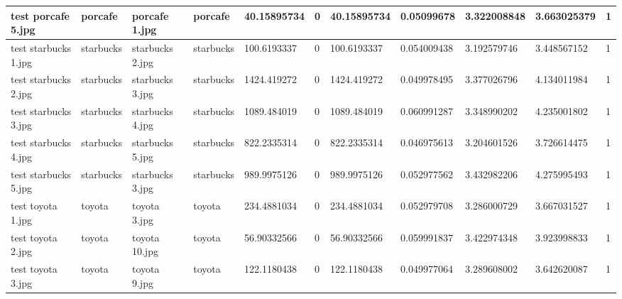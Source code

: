 \begin{landscape}
\begin{longtable}{|p{2cm}|p{1.5cm}|p{2cm}|p{1.5cm}|p{2cm}|p{1cm}|p{2cm}|p{2cm}|p{2cm}|p{2cm}|p{1cm}|}
		test porcafe 5.jpg   & porcafe          & porcafe 1.jpg         & porcafe                     & 40.15895734           & 0                       & 40.15895734                & 0.05099678            & 3.322008848           & 3.663025379              & 1                \\ \hline
		test starbucks 1.jpg & starbucks        & starbucks 2.jpg       & starbucks                   & 100.6193337           & 0                       & 100.6193337                & 0.054009438           & 3.192579746           & 3.448567152              & 1                \\ \hline
		test starbucks 2.jpg & starbucks        & starbucks 3.jpg       & starbucks                   & 1424.419272           & 0                       & 1424.419272                & 0.049978495           & 3.377026796           & 4.134011984              & 1                \\ \hline
		test starbucks 3.jpg & starbucks        & starbucks 4.jpg       & starbucks                   & 1089.484019           & 0                       & 1089.484019                & 0.060991287           & 3.348990202           & 4.235001802              & 1                \\ \hline
		test starbucks 4.jpg & starbucks        & starbucks 5.jpg       & starbucks                   & 822.2335314           & 0                       & 822.2335314                & 0.046975613           & 3.204601526           & 3.726614475              & 1                \\ \hline
		test starbucks 5.jpg & starbucks        & starbucks 3.jpg       & starbucks                   & 989.9975126           & 0                       & 989.9975126                & 0.052977562           & 3.432982206           & 4.275995493              & 1                \\ \hline
		test toyota 1.jpg    & toyota           & toyota 3.jpg          & toyota                      & 234.4881034           & 0                       & 234.4881034                & 0.052979708           & 3.286000729           & 3.667031527              & 1                \\ \hline
		test toyota 2.jpg    & toyota           & toyota 10.jpg         & toyota                      & 56.90332566           & 0                       & 56.90332566                & 0.059991837           & 3.422974348           & 3.923998833              & 1                \\ \hline
		test toyota 3.jpg    & toyota           & toyota 9.jpg          & toyota                      & 122.1180438           & 0                       & 122.1180438                & 0.049977064           & 3.289608002           & 3.642620087              & 1                \\ \hline

\end{longtable}
\end{landscape}
